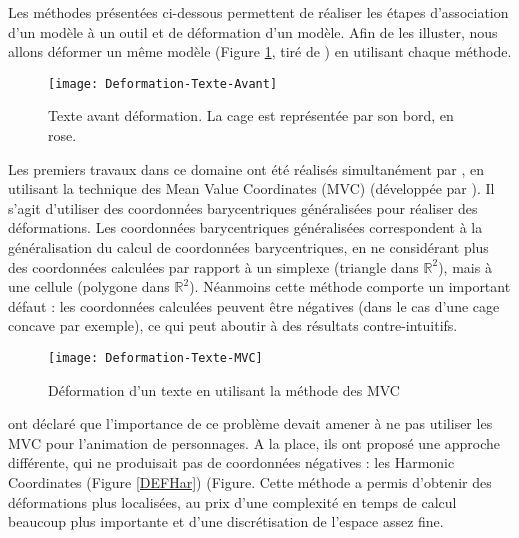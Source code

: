 Les méthodes présentées ci-dessous permettent de réaliser les étapes
d'association d'un modèle à un outil et de déformation d'un modèle. Afin de
les illuster, nous allons déformer un même modèle (Figure \ref{DEFAva}, tiré
de \cite{LLC08}) en utilisant chaque méthode.

\begin{figure}[ht]
\begin{center}
\texttt{[image: Deformation-Texte-Avant]}

\caption[Texte avant déformation] {Texte avant déformation. La cage est
représentée par son bord, en rose.}

\label{DEFAva}
\end{center}
\end{figure}

Les premiers travaux dans ce domaine ont été réalisés simultanément par
\cite{JSW05} \cite{FKR05}, en utilisant la technique des Mean Value
Coordinates (MVC) (développée par \cite{Flo03}). Il s'agit d'utiliser des
coordonnées barycentriques généralisées pour réaliser des déformations. Les
coordonnées barycentriques généralisées correspondent à la généralisation du
calcul de coordonnées barycentriques, en ne considérant plus des coordonnées
calculées par rapport à un simplexe (triangle dans $\mathbb{R}^2$), mais à une
cellule (polygone dans $\mathbb{R}^2$). Néanmoins cette méthode comporte un
important défaut : les coordonnées calculées peuvent être négatives (dans le
cas d'une cage concave par exemple), ce qui peut aboutir à des
résultats contre-intuitifs.

\begin{figure}[ht]
\begin{center}
\texttt{[image: Deformation-Texte-MVC]}

\caption[Déformation d'un texte (MVC)] {Déformation d'un texte en utilisant la
méthode des MVC}

\label{DEFMea}
\end{center}
\end{figure}

\cite{JMDGS07} ont déclaré que l'importance de ce problème devait amener à ne
pas utiliser les MVC pour l'animation de personnages. A la place, ils ont
proposé une approche différente, qui ne produisait pas de coordonnées
négatives : les Harmonic Coordinates (Figure \ref{DEFHar}) (Figure. Cette méthode a permis d'obtenir
des déformations plus localisées, au prix d'une complexité en temps de
calcul beaucoup plus importante et d'une discrétisation de l'espace assez
fine.

